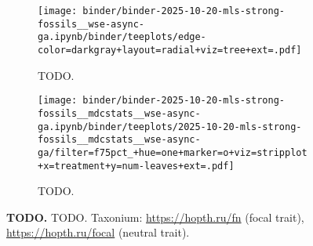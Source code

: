 \begin{figure}

\begin{minipage}[t]{0.75\linewidth}%
\vspace*{0pt}%
\begin{subfigure}[t]{0.6\linewidth}
    \centering
    \texttt{[image: binder/binder-2025-10-20-mls-strong-fossils\_\_wse-async-ga.ipynb/binder/teeplots/edge-color=darkgray+layout=radial+viz=tree+ext=.pdf]}
    \caption{\footnotesize
    TODO.
    }
    \label{fig:use-case-mls:phylo}
\end{subfigure}%
\begin{subfigure}[t]{0.4\linewidth}
    \centering
    \texttt{[image: binder/binder-2025-10-20-mls-strong-fossils\_\_mdcstats\_\_wse-async-ga.ipynb/binder/teeplots/2025-10-20-mls-strong-fossils\_\_mdcstats\_\_wse-async-ga/filter=f75pct\_+hue=one+marker=o+viz=stripplot+x=treatment+y=num-leaves+ext=.pdf]}
    \caption{\footnotesize
    TODO.
    }
    \label{fig:use-case-mls:cladesize}
\end{subfigure}
\end{minipage}%
\begin{minipage}[t]{0.25\linewidth}%
\vspace{0pt}%
\caption{%
\textbf{TODO.}
\footnotesize
TODO.
Taxonium: \url{https://hopth.ru/fn} (focal trait), \url{https://hopth.ru/focal} (neutral trait).
}
\label{fig:use-case-mls}
\end{minipage}
\end{figure}
